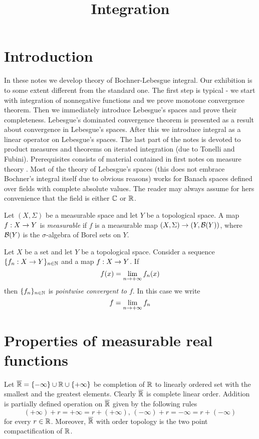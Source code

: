 



\title{Integration}
\date{}
\maketitle

\section{Introduction}
In these notes we develop theory of Bochner-Lebesgue integral. Our exhibition is to some extent different from the standard one. The first step is typical - we start with integration of nonnegative functions and we prove monotone convergence theorem. Then we immediately introduce Lebesgue's spaces and prove their completeness. Lebesgue's dominated convergence theorem is presented as a result about convergence in Lebesgue's spaces. After this we introduce integral as a linear operator on Lebesgue's spaces. The last part of the notes is devoted to product measures and theorems on iterated integration (due to Tonelli and Fubini). Prerequisites consists of material contained in first notes on measure theory \cite{Introduction_to_measure_theory}. Most of the theory of Lebesgue's spaces (this does not embrace Bochner's integral itself due to obvious reasons) works for Banach spaces defined over fields with complete absolute values. The reader may always assume for hers convenience that the field is either ${\mathbb C}$ or ${\mathbb R}$.

\begin{definition}
Let $(X,\Sigma)$ be a measurable space and let $Y$ be a topological space. A map $f:X\rightarrow Y$ is \textit{measurable} if $f$ is a measurable map $(X,\Sigma)\rightarrow (Y,{\mathcal B}(Y))$, where ${\mathcal B}(Y)$ is the $\sigma$-algebra of Borel sets on $Y$. 
\end{definition}

\begin{definition}
Let $X$ be a set and let $Y$ be a topological space. Consider a sequence $\{f_n:X\rightarrow Y\}_{n\in {\mathbb N}}$ and a map $f:X\rightarrow Y$. If 
$$f(x) = \lim_{n\rightarrow +\infty}f_n(x)$$
then $\{f_n\}_{n\in {\mathbb N}}$ is \textit{pointwise convergent to $f$}. In this case we write
$$f = \lim_{n\rightarrow +\infty}f_n$$
\end{definition}

\section{Properties of measurable real functions}
\noindent
Let $\overline{{\mathbb R}}=\{-\infty\} \cup {\mathbb R} \cup \{+\infty\}$ be completion of ${\mathbb R}$ to linearly ordered set with the smallest and the greatest elements. Clearly $\overline{{\mathbb R}}$ is complete linear order. Addition is partially defined operation on $\overline{{\mathbb R}}$ given by the following rules
$$(+\infty)+r=+\infty=r+(+\infty),\,(-\infty)+r=-\infty=r+(-\infty)$$
for every $r\in {\mathbb R}$. Moreover, $\overline{{\mathbb R}}$ with order topology is the two point compactification of ${\mathbb R}$.

